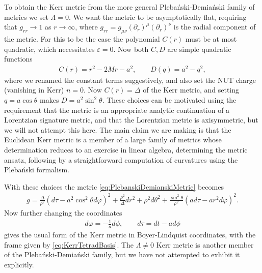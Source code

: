 \documentclass[10pt]{report}
\newcommand{\pleb}[0]{Pleba\'nski}
\newcommand{\demi}[0]{Demia\'nski}
\theoremstyle{definition}
\begin{document}
To obtain the Kerr metric from the more general \pleb{}-\demi{} family of metrics we set $\Lambda = 0$. We want the metric to be asymptotically flat, requiring that $g_{rr} \rightarrow 1$ as $r \rightarrow \infty$, where $g_{rr} = g_{\mu\nu} (\partial_r)^\mu (\partial_r)^\nu$ is the radial component of the metric. For this to be the case the polynomial $C(r)$ must be at most quadratic, which necessitates $\varepsilon = 0$.
Now both $C,D$ are simple quadratic functions
\begin{align}
    C(r) = r^2 - 2Mr -a^2, \qquad 
    D(q) = a^2 - q^2,
\end{align}
where we renamed the constant terms suggestively, and also set the NUT charge (vanishing in Kerr) $n=0$. Now $C(r)=\Delta$ of the Kerr metric, and setting $q=a\cos\theta$ makes $D=a^2\sin^2\theta$. These choices can be motivated using the requirement that the metric is an appropriate analytic continuation of a Lorentzian signature metric, and that the Lorentzian metric is axisymmetric, but we will not attempt this here. The main claim we are making is that the Euclidean Kerr metric is a member of a large family of metrics whose determination reduces to an exercise in linear algebra, determining the metric ansatz, following by a straightforward computation of curvatures using the \pleb{} formalism. 

With these choices the metric \cref{eq:PlebanskiDemianskiMetric} becomes
\begin{align}
    g = \frac{\Delta}{\rho^2}(d\tau- a^2\cos^2\theta d\varphi)^2 + \frac{\rho^2}{\Delta} dr^2 + \rho^2 d\theta^2 + \frac{\sin^2\theta}{\rho^2} (a d\tau-a r^2 d\varphi)^2.
 \end{align}
 Now further changing the coordinates
 \begin{align}
 d\varphi = -\frac{1}{a} d\phi, \qquad d\tau = dt - a d\phi
 \end{align}
 gives the usual form of the Kerr metric in Boyer-Lindquist coordinates, with the frame given by \cref{eq:KerrTetradBasis}. The $\Lambda\not=0$ Kerr metric is another member of the \pleb{}-\demi{} family, but we have not attempted to exhibit it explicitly. 
\end{document}
